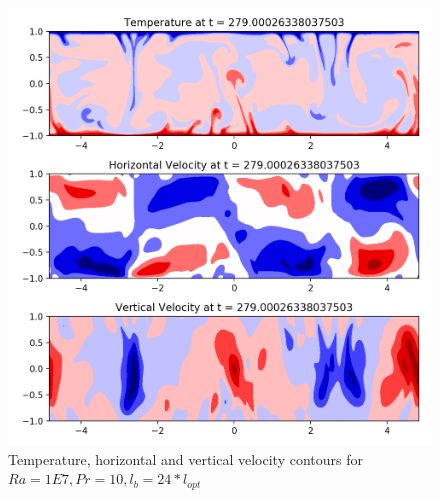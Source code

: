 \documentclass[12pt]{article}
\begin{document}
     
     \begin{figure}[!htb]
     	\includegraphics[width=\linewidth]{contours_1E7_10_24.png}
     	\caption{Temperature, horizontal and vertical velocity contours for $Ra = 1E7, Pr =10, l_b = 24* l_{opt} $ }
     	\label{fig:fig22}
     \end{figure}
     
\end{document}
